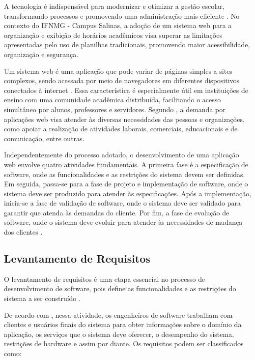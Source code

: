 A tecnologia é indispensável para modernizar e otimizar a gestão escolar, transformando processos e promovendo uma administração mais eficiente \cite{Urania2024}. No contexto do IFNMG - Campus Salinas, a adoção de um sistema web para a organização e exibição de horários acadêmicos visa superar as limitações apresentadas pelo uso de planilhas tradicionais, promovendo maior acessibilidade, organização e segurança.

Um sistema web é uma aplicação que pode variar de páginas simples a sites complexos, sendo acessada por meio de navegadores em diferentes dispositivos conectados à internet \cite{pressman2016engenharia}. Essa característica é especialmente útil em instituições de ensino com uma comunidade acadêmica distribuída, facilitando o acesso simultâneo por alunos, professores e servidores. Segundo , a demanda por aplicações web visa atender às diversas necessidades das pessoas e organizações, como apoiar a realização de atividades laborais, comerciais, educacionais e de comunicação, entre outras.

Independentemente do processo adotado, o desenvolvimento de uma aplicação web envolve quatro atividades fundamentais. A primeira fase é a especificação de software, onde as funcionalidades e as restrições do sistema devem ser definidas. Em seguida, passa-se para a fase de projeto e implementação de software, onde o sistema deve ser produzido para atender às especificações. Após a implementação, inicia-se a fase de validação de software, onde o sistema deve ser validado para garantir que atenda às demandas do cliente. Por fim, a fase de evolução de software, onde o sistema deve evoluir para atender às necessidades de mudança dos clientes \cite{sommerville2011engenharia}.

\subsection{Levantamento de Requisitos}

O levantamento de requisitos é uma etapa essencial no processo de desenvolvimento de software, pois define as funcionalidades e as restrições do sistema a ser construído \cite{Balieiro_Pinto_2025}.

De acordo com , nessa atividade, os engenheiros de software trabalham com clientes e usuários finais do sistema para obter informações sobre o domínio da aplicação, os serviços que o sistema deve oferecer, o desempenho do sistema, restrições de hardware e assim por diante. Os requisitos podem ser classificados como:

